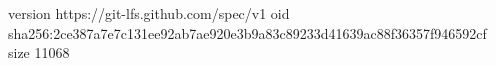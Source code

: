version https://git-lfs.github.com/spec/v1
oid sha256:2ce387a7e7c131ee92ab7ae920e3b9a83c89233d41639ac88f36357f946592cf
size 11068
